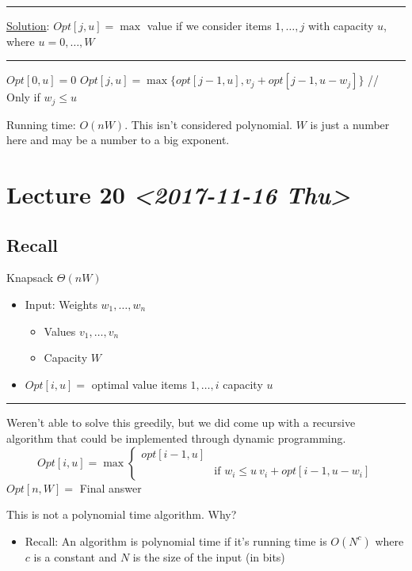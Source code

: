 \documentclass[11pt]{article}
\begin{document}
\noindent\rule{\textwidth}{0.5pt}
\uline{Solution}:
\(Opt[j,u]=\max\) value if we consider items \(1,\ldots,j\) with capacity \(u\), where \(u=0, \ldots, W\)

\noindent\rule{\textwidth}{0.5pt}
\begin{algorithmic}
	\State $Opt[0,u]=0$
\EndFor
{}
	   \State $Opt[j,u] = \max \{opt[j-1,u], v_j+opt[j-1,u-w_j]\}$
	   \State // Only if $w_j \leq u$
\EndFor
\end{algorithmic}
Running time: \(O(nW)\). This isn't considered polynomial. \(W\) is just a number here and may be a number to a big exponent.
\section{Lecture 20 \textit{<2017-11-16 Thu>}}
\label{sec:orgce43060}
\subsection{Recall}
\label{sec:org9e12ae1}
Knapsack \(\Theta(nW)\)
\begin{itemize}
\item Input: Weights \(w_1,\ldots,w_n\)
\begin{itemize}
\item Values \(v_1,\ldots,v_n\)
\item Capacity \(W\)
\end{itemize}
\item \(Opt[i,u]=\) optimal value items \(1,\ldots,i\) capacity \(u\)
\end{itemize}

\noindent\rule{\textwidth}{0.5pt}
Weren't able to solve this greedily, but we did come up with a recursive algorithm that could be implemented through dynamic programming.
\begin{equation*}
Opt[i,u] = \max 
\begin{cases}
opt[i-1, u]
\\ & \text{if } w_i\leq u \ v_i + opt[i-1, u-w_i]
\end{cases}
\end{equation*}
\(Opt[n,W]=\) Final answer

This is not a polynomial time algorithm. Why?
\begin{itemize}
\item Recall: An algorithm is polynomial time if it's running time is \(O(N^c)\) where \(c\) is a constant and \(N\) is the size of the input (in bits)
\end{itemize}
\end{document}
